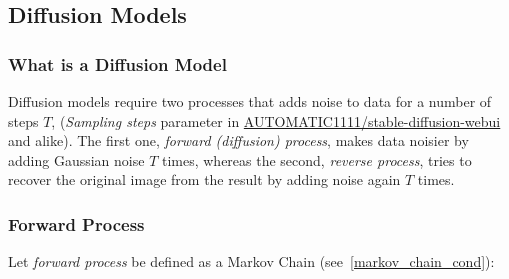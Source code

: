 \documentclass{article}
\numberwithin{equation}{subsection}
\begin{document}
\subsection{Diffusion Models}
\subsubsection{What is a Diffusion Model}

Diffusion models require two processes that adds noise to data for a number of steps $T$, (\textit{Sampling steps} parameter in \href{https://github.com/AUTOMATIC1111/stable-diffusion-webui}{AUTOMATIC1111/stable-diffusion-webui} and alike). The first one, \textit{forward (diffusion) process}, makes data noisier by adding Gaussian noise $T$ times, whereas the second, \textit{reverse process}, tries to recover the original image from the result by adding noise again $T$ times. 
\subsubsection{Forward Process}
Let \textit{forward process} be defined as a Markov Chain (see~\ref{markov_chain_cond}):
\end{document}
